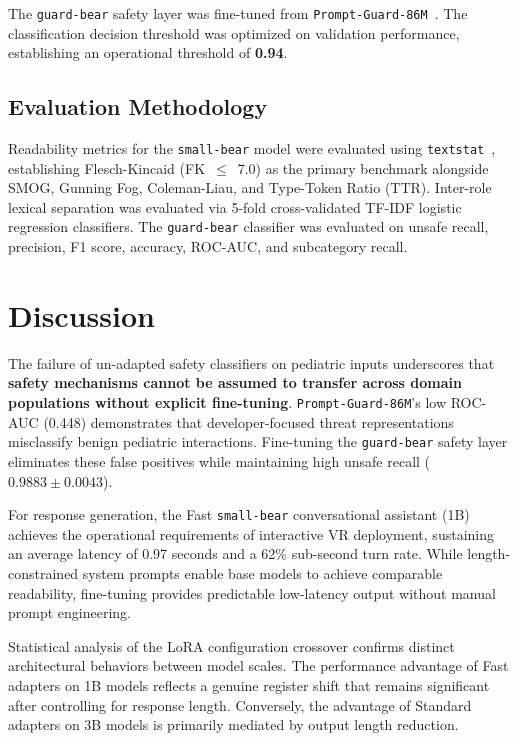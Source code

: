 \documentclass[pdflatex,sn-mathphys-num]{sn-jnl-official}%
\begin{document}
The \texttt{guard-bear} safety layer was fine-tuned from \texttt{Prompt-Guard-86M}~\cite{promptguard2024}. The classification decision threshold was optimized on validation performance, establishing an operational threshold of \textbf{0.94}.

\subsection{Evaluation Methodology}

Readability metrics for the \texttt{small-bear} model were evaluated using \texttt{textstat}~\cite{bansal2023textstat}, establishing Flesch-Kincaid (FK~$\leq$~7.0) as the primary benchmark alongside SMOG, Gunning Fog, Coleman-Liau, and Type-Token Ratio (TTR). Inter-role lexical separation was evaluated via 5-fold cross-validated TF-IDF logistic regression classifiers. The \texttt{guard-bear} classifier was evaluated on unsafe recall, precision, F1 score, accuracy, ROC-AUC, and subcategory recall.

\section{Discussion}\label{sec:discussion}

The failure of un-adapted safety classifiers on pediatric inputs underscores that \textbf{safety mechanisms cannot be assumed to transfer across domain populations without explicit fine-tuning}. \texttt{Prompt-Guard-86M}'s low ROC-AUC (0.448) demonstrates that developer-focused threat representations misclassify benign pediatric interactions. Fine-tuning the \texttt{guard-bear} safety layer eliminates these false positives while maintaining high unsafe recall ($0.9883\pm0.0043$).

For response generation, the Fast \texttt{small-bear} conversational assistant (1B) achieves the operational requirements of interactive VR deployment, sustaining an average latency of 0.97 seconds and a 62\% sub-second turn rate. While length-constrained system prompts enable base models to achieve comparable readability, fine-tuning provides predictable low-latency output without manual prompt engineering.

Statistical analysis of the LoRA configuration crossover confirms distinct architectural behaviors between model scales. The performance advantage of Fast adapters on 1B models reflects a genuine register shift that remains significant after controlling for response length. Conversely, the advantage of Standard adapters on 3B models is primarily mediated by output length reduction.
\end{document}
